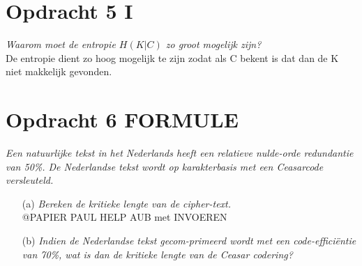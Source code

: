 \section{Opdracht 5 I}
\emph{Waarom moet de entropie $H(K|C)$ zo groot mogelijk zijn?}\\
De entropie dient zo hoog mogelijk te zijn zodat als C bekent is dat dan de K niet makkelijk gevonden.

\section{Opdracht 6 FORMULE}
\emph{Een natuurlijke tekst in het Nederlands heeft een relatieve nulde-orde redundantie van 50\%. De Nederlandse tekst wordt op karakterbasis met een Ceasarcode versleuteld.}\\
\begin{itemize}
  \item[(a)] \emph{Bereken de kritieke lengte van de cipher-text.}\\
    @PAPIER PAUL HELP AUB met INVOEREN
    
  \item[(b)] \emph{Indien de Nederlandse tekst gecom-primeerd wordt met een code-effici\"{e}ntie van 70\%, wat is dan de kritieke lengte van de Ceasar codering?}\\
\end{itemize}
